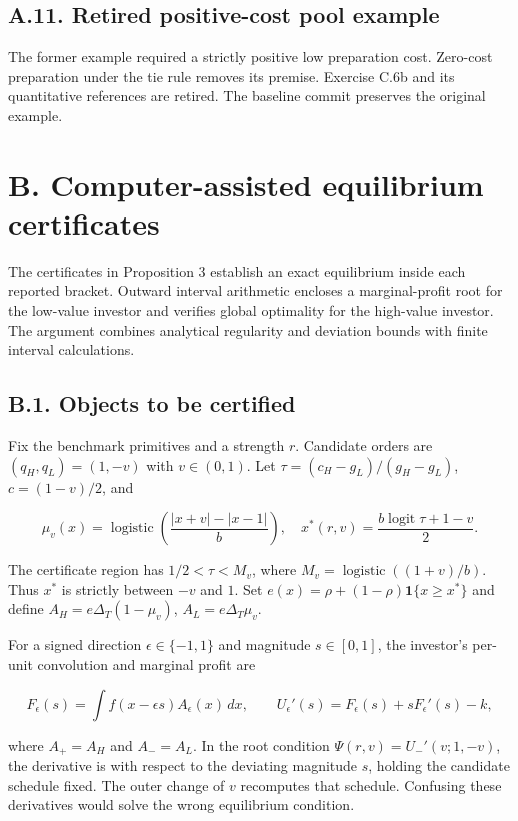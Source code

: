 \documentclass[
  11pt,
]{article}
\begin{document}
\subsection{A.11. Retired positive-cost pool example}\label{oa-a-pools}

The former example required a strictly positive low preparation cost.
Zero-cost preparation under the tie rule removes its premise. Exercise
C.6b and its quantitative references are retired. The baseline commit
preserves the original example.

\section{B. Computer-assisted equilibrium certificates}\label{oa-b}

The certificates in Proposition 3 establish an exact equilibrium inside
each reported bracket. Outward interval arithmetic encloses a
marginal-profit root for the low-value investor and verifies global
optimality for the high-value investor. The argument combines analytical
regularity and deviation bounds with finite interval calculations.

\subsection{B.1. Objects to be certified}\label{oa-b-objects}

Fix the benchmark primitives and a strength \(r\). Candidate orders are
\((q_H,q_L)=(1,-v)\) with \(v\in(0,1)\). Let
\(\tau=(c_H-g_L)/(g_H-g_L)\), \(c=(1-v)/2\), and

\[
\mu_v(x)=\operatorname{logistic}\left(\frac{|x+v|-|x-1|}{b}\right),\quad
x^*(r,v)=\frac{b\operatorname{logit}\tau+1-v}{2}.
\tag{OA.65}\label{eq:oa-oa-65}
\]

The certificate region has \(1/2<\tau<M_v\), where
\(M_v=\operatorname{logistic}((1+v)/b)\). Thus \(x^*\) is strictly
between \(-v\) and \(1\). Set \(e(x)=\rho+(1-\rho)\mathbf1\{x\ge x^*\}\)
and define \(A_H=e\Delta_T(1-\mu_v)\), \(A_L=e\Delta_T\mu_v\).

For a signed direction \(\epsilon\in\{-1,1\}\) and magnitude
\(s\in[0,1]\), the investor's per-unit convolution and marginal profit
are

\[
F_\epsilon(s)=\int f(x-\epsilon s)A_\epsilon(x)\,dx,
\qquad U_\epsilon'(s)=F_\epsilon(s)+sF_\epsilon'(s)-k,
\tag{OA.66}\label{eq:oa-oa-66}
\]

where \(A_+=A_H\) and \(A_-=A_L\). In the root condition
\(\Psi(r,v)=U_-'(v;1,-v)\), the derivative is with respect to the
deviating magnitude \(s\), holding the candidate schedule fixed. The
outer change of \(v\) recomputes that schedule. Confusing these
derivatives would solve the wrong equilibrium condition.
\end{document}
